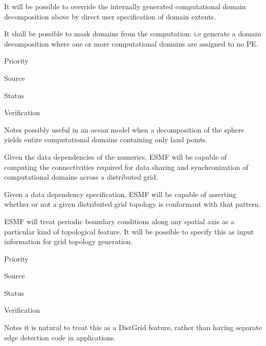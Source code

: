 
It will be possible to override the internally generated computational
domain decomposition above by direct user specification of domain
extents.


It shall be possible to mask domains from the computation: i.e
generate a domain decomposition where one or more computational
domains are assigned to no PE.

\begin{reqlist}
\item[Priority]
\item[Source]
\item[Status]
\item[Verification]
\item[Notes] possibly useful in an ocean model when a decomposition
  of the sphere yields entire computational domains containing only
  land points.
\end{reqlist}


Given the data dependencies of the numerics, ESMF will be capable of
computing the connectivities required for data sharing and
synchronization of computational domains across a distributed grid.


Given a data dependency specification, ESMF will be capable of
asserting whether or not a given distributed grid topology is
conformant with that pattern.


ESMF will treat periodic boundary conditions along any spatial axis as
a particular kind of topological feature. It will be possible to
specify this as input information for grid topology generation.

\begin{reqlist}
\item[Priority]
\item[Source]
\item[Status]
\item[Verification]
\item[Notes] it is natural to treat this as a DistGrid feature, rather
  than having separate edge detection code in applications.
\end{reqlist}


